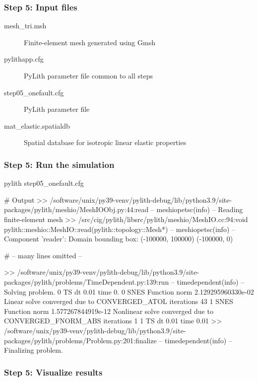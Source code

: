 \documentclass[aspectratio=169]{beamer}
\begin{document}
\begin{frame}
  \frametitle{Step 5: Input files}
  \summary{}

  \begin{description}
  \item[mesh\_tri.msh] Finite-element mesh generated using Gmsh
  \item[pylithapp.cfg] PyLith parameter file common to all steps
  \item[step05\_onefault.cfg] PyLith parameter file
  \item[mat\_elastic.spatialdb] Spatial database for isotropic linear elastic properties
  \end{description}
    
\end{frame}


\begin{frame}[fragile]
  \frametitle{Step 5: Run the simulation}
  \summary{}

\begin{bashcode}
pylith step05_onefault.cfg

# Output
 >> /software/unix/py39-venv/pylith-debug/lib/python3.9/site-packages/pylith/meshio/MeshIOObj.py:44:read
 -- meshiopetsc(info)
 -- Reading finite-element mesh
 >> /src/cig/pylith/libsrc/pylith/meshio/MeshIO.cc:94:void pylith::meshio::MeshIO::read(pylith::topology::Mesh*)
 -- meshiopetsc(info)
 -- Component 'reader': Domain bounding box:
    (-100000, 100000)
    (-100000, 0)

# -- many lines omitted --

 >> /software/unix/py39-venv/pylith-debug/lib/python3.9/site-packages/pylith/problems/TimeDependent.py:139:run
 -- timedependent(info)
 -- Solving problem.
0 TS dt 0.01 time 0.
    0 SNES Function norm 2.129295960330e-02
    Linear solve converged due to CONVERGED_ATOL iterations 43
    1 SNES Function norm 1.577267844919e-12
  Nonlinear solve converged due to CONVERGED_FNORM_ABS iterations 1
1 TS dt 0.01 time 0.01
 >> /software/unix/py39-venv/pylith-debug/lib/python3.9/site-packages/pylith/problems/Problem.py:201:finalize
 -- timedependent(info)
 -- Finalizing problem.
\end{bashcode}
  
\end{frame}


\begin{frame}
  \frametitle{Step 5: Visualize results}

    
\end{frame}
\end{document}
